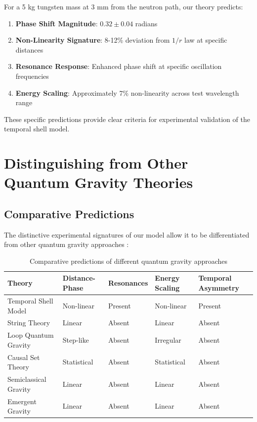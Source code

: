 \documentclass[12pt,a4paper]{article}
\begin{document}
For a 5 kg tungsten mass at 3 mm from the neutron path, our theory predicts:

\begin{enumerate}
    \item \textbf{Phase Shift Magnitude}: $0.32 \pm 0.04$ radians
    \item \textbf{Non-Linearity Signature}: 8-12\% deviation from $1/r$ law at specific distances
    \item \textbf{Resonance Response}: Enhanced phase shift at specific oscillation frequencies
    \item \textbf{Energy Scaling}: Approximately 7\% non-linearity across test wavelength range
\end{enumerate}

These specific predictions provide clear criteria for experimental validation of the temporal shell model.

\section{Distinguishing from Other Quantum Gravity Theories}

\subsection{Comparative Predictions}

The distinctive experimental signatures of our model allow it to be differentiated from other quantum gravity approaches \citep{string, lqg, emergent}:

\begin{table}[h]
\centering
\scriptsize
\setlength{\tabcolsep}{4pt}
\renewcommand{\arraystretch}{1.4}
\begin{tabular}{|p{}|>{\centering\arraybackslash}p{}|>{\centering\arraybackslash}p{}|>{\centering\arraybackslash}p{}|>{\centering\arraybackslash}p{}|}
\hline
\textbf{Theory} & \textbf{Distance-Phase} & \textbf{Resonances} & \textbf{Energy Scaling} & \textbf{Temporal Asymmetry} \\
\hline
Temporal Shell Model & Non-linear & Present & Non-linear & Present \\
\hline
String Theory & Linear & Absent & Linear & Absent \\
\hline
Loop Quantum Gravity & Step-like & Absent & Irregular & Absent \\
\hline
Causal Set Theory & Statistical & Absent & Statistical & Absent \\
\hline
Semiclassical Gravity & Linear & Absent & Linear & Absent \\
\hline
Emergent Gravity & Linear & Absent & Linear & Absent \\
\hline
\end{tabular}
\caption{Comparative predictions of different quantum gravity approaches}
\label{tab:comparisons}
\end{table}
\end{document}
